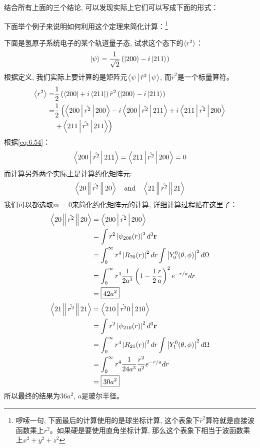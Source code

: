 结合所有上面的三个结论, 可以发现实际上它们可以写成下面的形式：
\begin{lequation}
    \label{eq:6.54}
\end{lequation}
下面举个例子来说明如何利用这个定理来简化计算：\footnote{啰嗦一句, 下面最后的计算使用的是球坐标计算, 这个表象下$\hat{r}^2$算符就是直接波函数乘上$r^2$。如果硬是要使用直角坐标计算, 那么这个表象下相当于波函数乘上$x^2+y^2+z^2$}
\begin{thinknote}
    下面是氢原子系统电子的某个轨道量子态, 试求这个态下的$\braket{r^2}$：
    \begin{equation}
        \ket{\psi}=\frac{1}{\sqrt{2}}\left(\ket{200}-i\ket{211}\right)
    \end{equation}
    根据定义, 我们实际上要计算的是矩阵元$\Braket{\psi|\hat{r}^2|\psi}$, 而$\hat{r}^2$是一个标量算符。
    \begin{align*}
        \Braket{r^2}=&\frac{1}{2}\left(\bra{200}+i\bra{211}\right)\hat{r}^2\left(\ket{200}-i\ket{211}\right)\\
        =&\frac{1}{2}\left(\Braket{200|\hat{r^2}|200}-i\Braket{200|\hat{r^2}|211}+i\Braket{211|\hat{r^2}|200}\right.\\
        &\left.+\Braket{211|\hat{r^2}|211}\right)
    \end{align*}
    根据\ref{eq:6.54}：
    \begin{equation}
        \Braket{200|\hat{r^2}|211}=\Braket{211|\hat{r^2}|200}=0
    \end{equation}
    而计算另外两个实际上是计算约化矩阵元:
    \[\Braket{20\|\hat{r^2}\|20}\quad \text{and}\quad \Braket{21\|\hat{r^2}\|21}\]
    我们可以都选取$m=0$来简化约化矩阵元的计算, 详细计算过程贴在这里了：
    \begin{align*}
        \Braket{20\|\hat{r^2}\|20}&=\Braket{200|\hat{r^2}|200}\\
        &=\int r^{2}\left|\psi_{200}(r)\right|^{2} d^{3} \mathbf{r} \\
        &=\int_{0}^{\infty} r^{4}\left|R_{20}(r)\right|^{2} d r \int\left|Y_{0}^{0}(\theta, \phi)\right|^{2} d \Omega \\
        &=\int_{0}^{\infty} r^{4} \frac{1}{2 a^{3}}\left(1-\frac{1}{2} \frac{r}{a}\right)^{2} e^{-r / a} d r \\
        &=\boxed{42 a^{2} }
    \end{align*}
    \begin{align*}
        \Braket{21\|\hat{r^2}\|21}&=\Braket{210|\hat{r^2}0|210}\\
        &=\int r^{2}\left|\psi_{210}(r)\right|^{2} d^{3} \mathbf{r} \\
        &=\int_{0}^{\infty} r^{4}\left|R_{21}(r)\right|^{2} d r \int\left|Y_{1}^{0}(\theta, \phi)\right|^{2} d \Omega\\
        &=\int_{0}^{\infty} r^{4} \frac{1}{24 a^{3}} \frac{r^{2}}{a^{2}} e^{-r / a} d r\\
        &=\boxed{30 a^{2}}
    \end{align*}
    所以最终的结果为$36a^2$, $a$是玻尔半径。
\end{thinknote}

